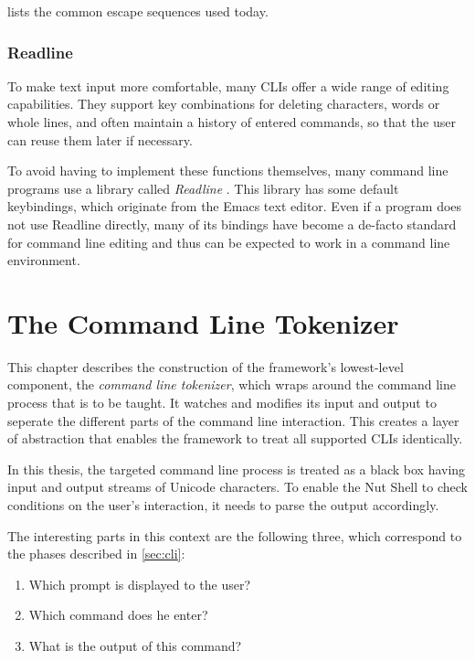\documentclass[paper=a4,twoside,abstract=on,cleardoublepage=empty,numbers=noenddot,toc=bib,12pt,appendixprefix=true]{scrreprt}
\begin{document}
 lists the common escape sequences used today. 

\subsection{Readline}

To make text input more comfortable, many CLIs offer a wide range of editing capabilities. They support key combinations for deleting characters, words or whole lines, and often maintain a history of entered commands, so that the user can reuse them later if necessary.

To avoid having to implement these functions themselves, many command line programs use a library called \emph{Readline} \cite{readline}. This library has some default keybindings, which originate from the Emacs text editor. Even if a program does not use Readline directly, many of its bindings have become a de-facto standard for command line editing and thus can be expected to work in a command line environment. 

\chapter{The Command Line Tokenizer}
\label{sec:cliparser}

This chapter describes the construction of the framework's lowest-level component, the \emph{command line tokenizer}, which wraps around the command line process that is to be taught. It watches and modifies its input and output to seperate the different parts of the command line interaction. This creates a layer of abstraction that enables the framework to treat all supported CLIs identically.

In this thesis, the targeted command line process is treated as a black box having input and output streams of Unicode characters. To enable the Nut Shell to check conditions on the user's interaction, it needs to parse the output accordingly.

The interesting parts in this context are the following three, which correspond to the phases described in \cref{sec:cli}:

\begin{enumerate}
    \item Which prompt is displayed to the user?
    \item Which command does he enter?
    \item What is the output of this command?
\end{enumerate}
\end{document}
